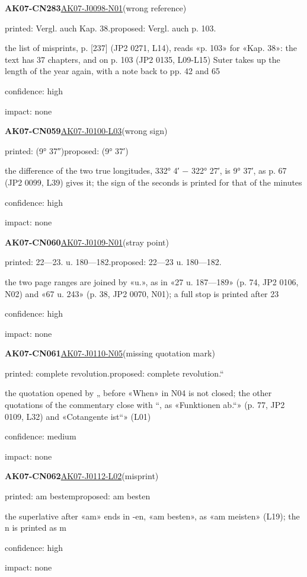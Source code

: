 \documentclass[11pt]{article}
\begin{document}
\noindent\textbf{AK07-CN283}\enspace\hyperlink{AK07-J0098-N01}{AK07-J0098-N01}\enspace(wrong reference)\par\noindent printed: Vergl. auch Kap. 38.\enspace proposed: Vergl. auch p. 103.\par\noindent the list of misprints, p. [237] (JP2 0271, L14), reads «p. 103» for «Kap. 38»: the text has 37 chapters, and on p. 103 (JP2 0135, L09-L15) Suter takes up the length of the year again, with a note back to pp. 42 and 65\par\noindent confidence: high\par\noindent impact: none\par\medskip
\noindent\textbf{AK07-CN059}\enspace\hyperlink{AK07-J0100-L03}{AK07-J0100-L03}\enspace(wrong sign)\par\noindent printed: (9° 37″)\enspace proposed: (9° 37′)\par\noindent the difference of the two true longitudes, 332° 4′ − 322° 27′, is 9° 37′, as p. 67 (JP2 0099, L39) gives it; the sign of the seconds is printed for that of the minutes\par\noindent confidence: high\par\noindent impact: none\par\medskip
\noindent\textbf{AK07-CN060}\enspace\hyperlink{AK07-J0109-N01}{AK07-J0109-N01}\enspace(stray point)\par\noindent printed: 22—23. u. 180—182.\enspace proposed: 22—23 u. 180—182.\par\noindent the two page ranges are joined by «u.», as in «27 u. 187—189» (p. 74, JP2 0106, N02) and «67 u. 243» (p. 38, JP2 0070, N01); a full stop is printed after 23\par\noindent confidence: high\par\noindent impact: none\par\medskip
\noindent\textbf{AK07-CN061}\enspace\hyperlink{AK07-J0110-N05}{AK07-J0110-N05}\enspace(missing quotation mark)\par\noindent printed: complete revolution.\enspace proposed: complete revolution.“\par\noindent the quotation opened by „ before «When» in N04 is not closed; the other quotations of the commentary close with “, as «Funktionen ab.“» (p. 77, JP2 0109, L32) and «Cotangente ist“» (L01)\par\noindent confidence: medium\par\noindent impact: none\par\medskip
\noindent\textbf{AK07-CN062}\enspace\hyperlink{AK07-J0112-L02}{AK07-J0112-L02}\enspace(misprint)\par\noindent printed: am bestem\enspace proposed: am besten\par\noindent the superlative after «am» ends in -en, «am besten», as «am meisten» (L19); the n is printed as m\par\noindent confidence: high\par\noindent impact: none\par\medskip
\end{document}
